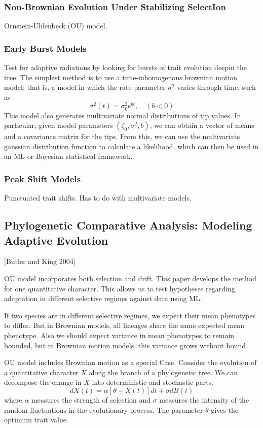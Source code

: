 \documentclass{article}
\begin{document}
\subsubsection{Non-Brownian Evolution Under Stabilizing SelectIon}
Ornstein-Uhlenbeck (OU) model.

\subsubsection{Early Burst Models}
Test for adaptive radiations by looking for bursts of trait evolution deepin the
tree. The simplest method is to use a time-inhomogenous brownian motion model;
that is, a model in which the rate parameter $\sigma^{2}$ varies through time, such as
\begin{equation*}
  \sigma^{2}(t) = \sigma_0^{2}e^{bt}, \quad(b<0)
\end{equation*}
This model also generates multivariate normal distributions of tip values. In
particular, given model parameters $(\overline{\zeta}_0,\sigma^{2},b)$, we can
obtain a vector of means and a covariance matrix for the tips. From this, we can
use the multivariate gaussian distribution function to calculate a likelihood,
which can then be used in an ML or Bayesian statistical framework.

\subsubsection{Peak Shift Models}
Punctuated trait shifts. Has to do with multivariate models.


\subsection{Phylogenetic Comparative Analysis: Modeling Adaptive Evolution}
[Butler and King 2004]

OU model incorporates both selection and drift. This paper develops the method for one quantitative character. This allows us to test hypotheses regarding adaptation in different selective regimes against data using ML. 

If two species are in different selective regimes, we expect their mean phenotypes to differ. But in Brownian models, all lineages share the same expected mean phenotype. Also we should expect variance in mean phenotypes to remain bounded, but in Brownian motion models, this variance grows without bound.

OU model includes Brownian motion as a special Case. Consider the evolution of a quantitative character $X$ along the branch of a phylogenetic tree. We can decompose the change in $X$ into deterministic and stochastic parts:
\begin{equation*}
  dX(t) = \alpha \left[ \theta -X(t) \right]dt + \sigma dB(t)
\end{equation*}
where $\alpha$ measures the strength of selection and $\sigma$ measures the intensity of the random fluctuations in the evolutionary process. The parameter $\theta$ gives the optimum trait value.
\end{document}
